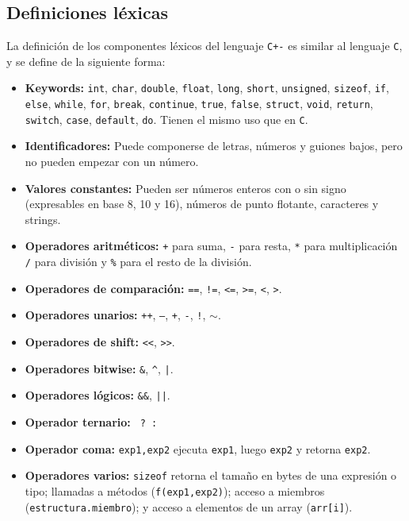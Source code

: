 \documentclass[12pt]{article}
\newcommand{\C}{\texttt{C}}
\begin{document}
\begin{itemize}
\subsection*{Definiciones l\'exicas}

La definici\'on de los componentes l\'exicos del lenguaje \texttt{C+-} es similar al lenguaje \C, y se define de la siguiente forma:
\begin{itemize}
    \item \textbf{Keywords:} \texttt{int}, \texttt{char}, \texttt{double}, \texttt{float}, \texttt{long}, \texttt{short}, \texttt{unsigned}, \texttt{sizeof}, \texttt{if}, \texttt{else}, \texttt{while}, \texttt{for}, \texttt{break}, \texttt{continue}, \texttt{true}, \texttt{false}, \texttt{struct}, \texttt{void}, \texttt{return}, \texttt{switch}, \texttt{case}, \texttt{default}, \texttt{do}. Tienen el mismo uso que en \C.
    \item \textbf{Identificadores:} Puede componerse de letras, n\'umeros y guiones bajos, pero no pueden empezar con un n\'umero.
    \item \textbf{Valores constantes:} Pueden ser n\'umeros enteros con o sin signo (expresables en base 8, 10 y 16), n\'umeros de punto flotante, caracteres y strings.
    \item \textbf{Operadores aritm\'eticos:} \texttt{+} para suma, \texttt{-} para resta, \texttt{*} para multiplicaci\'on \texttt{/} para divisi\'on y \texttt{\%} para el resto de la divisi\'on.
    \item \textbf{Operadores de comparaci\'on:} \texttt{==}, \texttt{!=}, \texttt{<=}, \texttt{>=}, \texttt{<}, \texttt{>}.
    \item \textbf{Operadores unarios:} \texttt{++}, \texttt{--}, \texttt{+}, \texttt{-}, \texttt{!}, $\mathtt\sim$.
    \item \textbf{Operadores de shift:} \texttt{<{}<}, \texttt{>{}>}.
    \item \textbf{Operadores bitwise:} \texttt{\&}, \texttt{\^}, \texttt{|}.
    \item \textbf{Operadores l\'ogicos:} \texttt{\&\&}, \texttt{||}.
    \item \textbf{Operador ternario:} \texttt{ ? : }
    \item \textbf{Operador coma:} \texttt{exp1,exp2} ejecuta \texttt{exp1}, luego \texttt{exp2} y retorna \texttt{exp2}.
    \item \textbf{Operadores varios:} \texttt{sizeof} retorna el tama\~no en bytes de una expresi\'on o tipo; llamadas a m\'etodos (\texttt{f(exp1,exp2)}); acceso a miembros (\texttt{estructura.miembro}); y acceso a elementos de un array (\texttt{arr[i]}).
\end{itemize}


\end{itemize}
\end{document}
